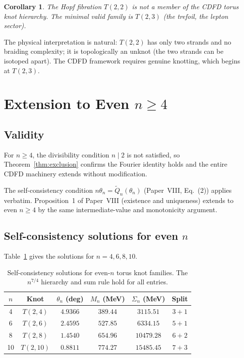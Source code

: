\documentclass[11pt]{article}
\newtheorem{corollary}{Corollary}
\begin{document}
\begin{corollary}
  The Hopf fibration $T(2,2)$ is not a member of the CDFD torus knot
  hierarchy.
  The minimal valid family is $T(2,3)$ (the trefoil, the lepton sector).
\end{corollary}

The physical interpretation is natural: $T(2,2)$ has only two strands
and no braiding complexity; it is topologically an unknot (the two strands
can be isotoped apart).
The CDFD framework requires genuine knotting, which begins at $T(2,3)$.


\section{Extension to Even $n \geq 4$}
\label{sec:even_n}

\subsection{Validity}

For $n \geq 4$, the divisibility condition $n \mid 2$ is not satisfied,
so Theorem~\ref{thm:exclusion} confirms the Fourier identity holds and
the entire CDFD machinery extends without modification.

The self-consistency condition $n\theta_n = \widetilde{Q}_n(\theta_n)$
(Paper~VIII, Eq.~(2)) applies verbatim.
Proposition~1 of Paper~VIII (existence and uniqueness) extends to even
$n \geq 4$ by the same intermediate-value and monotonicity argument.

\subsection{Self-consistency solutions for even $n$}

Table~\ref{tab:even_sc} gives the solutions for $n = 4, 6, 8, 10$.

\begin{table}[ht]
  \caption{Self-consistency solutions for even-$n$ torus knot families.
    The $n^{7/4}$ hierarchy and sum rule hold for all entries.}
  \label{tab:even_sc}
  \begin{tabular}{cccccc}
    \toprule
    $n$ & Knot & $\theta_n$ (deg) & $M_n$ (MeV) & $\Sigma_n$ (MeV) & Split \\
    \midrule
    4 & $T(2,4)$ & $4.9366$ & $389.44$ & $3115.51$  & $3+1$ \\
    6 & $T(2,6)$ & $2.4595$ & $527.85$ & $6334.15$  & $5+1$ \\
    8 & $T(2,8)$ & $1.4540$ & $654.96$ & $10479.28$ & $6+2$ \\
   10 & $T(2,10)$& $0.8811$ & $774.27$ & $15485.45$ & $7+3$ \\
    \bottomrule
  \end{tabular}
\end{table}
\end{document}
